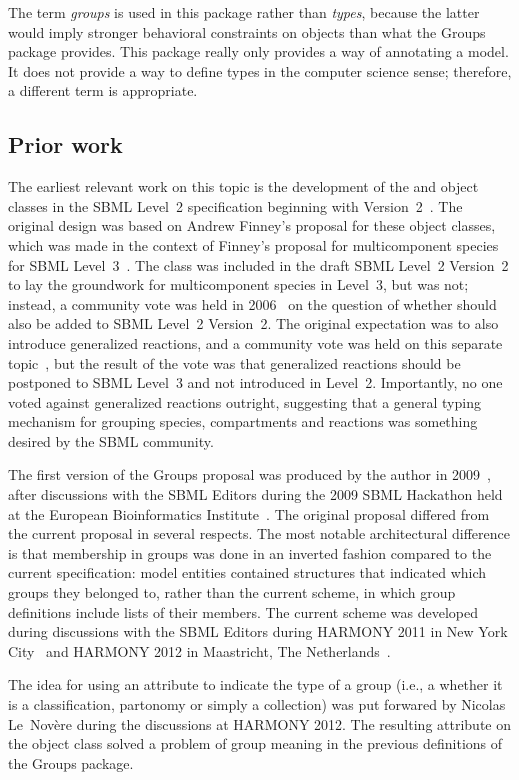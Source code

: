 The term \emph{groups} is used in this package rather than \emph{types}, because the latter would imply stronger behavioral constraints on objects than what the Groups package provides. This package really only provides a way of annotating a model.  It does not provide a way to define types in the computer science sense; therefore, a different term is appropriate.


\subsection{Prior work}

The earliest relevant work on this topic is the development of the \CompartmentType and \SpeciesType object classes in the SBML Level~2 specification beginning with Version~2~\citep{l2v2}. The original design was based on Andrew Finney's proposal for these object classes, which was made in the context of Finney's proposal for multicomponent species for SBML Level~3~\citep{finney_2004}. The \SpeciesType class was included in the draft SBML Level~2 Version~2 to lay the groundwork for multicomponent species in Level~3, but  was not; instead, a community vote was held in 2006~\citep{vote_2006} on the question of whether  should also be added to SBML Level~2 Version~2. The original expectation was to also introduce generalized reactions, and a community vote was held on this separate topic~\citep{vote_2006b}, but the result of the vote was that generalized reactions should be postponed to SBML Level~3 and not introduced in Level~2. Importantly, no one voted against generalized reactions outright, suggesting that a general typing mechanism for grouping species, compartments and reactions was something desired by the SBML community.

The first version of the Groups proposal was produced by the author in 2009~\citep{hucka_2009}, after discussions with the SBML Editors during the 2009 SBML Hackathon held at the European Bioinformatics Institute~\citep{sbml_hackathon_2009}.  The original proposal differed from the current proposal in several respects. The most notable architectural difference is that membership in groups was done in an inverted fashion compared to the current specification: model entities contained structures that indicated which groups they belonged to, rather than the current scheme, in which group definitions include lists of their members.  The current scheme was developed during discussions with the SBML Editors during HARMONY 2011 in New York City~\citep{harmony_2011} and HARMONY 2012 in Maastricht, The Netherlands~\citep{harmony_2012}.

The idea for using an attribute to indicate the type of a group (i.e., a whether it is a classification, partonomy or simply a collection) was put forwared by Nicolas Le~Nov\`{e}re during the discussions at HARMONY 2012.  The resulting attribute  on the \Group object class solved a problem of group meaning in the previous definitions of the Groups package.

